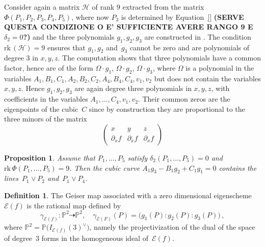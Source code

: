 \documentclass[a4paper, 11pt, reqno]{amsart}
\theoremstyle{plain}
\newtheorem{prop}[lemma]{Proposition}
\theoremstyle{definition}
\newtheorem{definition}[lemma]{Definition}
\newcommand{\p}{\mathbb{P}}
\newcommand{\rk}{\ensuremath{\mathrm{rk}}}
\newcommand{\Eig}[1]{\mathcal{E}\!\left( {#1} \right)}
\begin{document}
Consider again a matrix $\mathcal{H}$ of rank $9$ extracted from
the matrix $\Phi(P_1, P_2, P_3, P_4, P_5)$, where now $P_3$ is determined by Equation~\eqref{} \textbf{(SERVE QUESTA CONDIZIONE O E' SUFFICIENTE AVERE RANGO 9 E $\delta_2 = 0$?)}
and the three polynomials $g_1, g_2, g_3$ are constructed
in . The condition
$\rk \,(\mathcal{H}) = 9$ ensures that
$g_1, g_2$ and~$g_3$ cannot be zero and are polynomials of degree
$3$ in $x, y, z$.
The computation shows that three polynomials have a common factor,
hence are of the form $\Omega \cdot g_1$, $\Omega \cdot g_2$, $\Omega \cdot g_3$, where
$\Omega$ is a polynomial in the variables
$A_1, B_1, C_1, A_2, B_2, C_2, A_4, B_4, C_4, v_1, v_2$ but
does not contain the variables $x, y, z$.
Hence $g_1, g_2, g_3$ are again
degree three polynomials in $x, y, z$, with coefficients in the variables
$A_1, \dots, C_4, v_1, v_2$. Their common zeros are the eigenpoints of the
cubic~$C$ since by construction they are proportional to the three minors of the matrix
%
\[
  \left(
  \begin{array}{ccc}
    x & y & z \\
    \partial_x f & \partial_x f & \partial_x f
  \end{array}
  \right)
\]
%

\begin{prop}
\label{proposition:G_split}
Assume that $P_1, \dots, P_5 $ satisfy $\delta_2(P_1, \dotsc, P_5) = 0$ and $\rk \, \Phi(P_1, \dotsc, P_5) = 9$. Then the cubic curve $A_1 g_3 - B_1 g_2 + C_1 g_1=0$ contains the lines~$P_1 \vee P_2$ and~$P_1 \vee P_4$.
\end{prop}

\begin{definition}
%
The Geiser map associated with a zero dimensional eigenscheme $\Eig{f}$ is the rational map defined by
%
\[
  \gamma_{\Eig{f}} \colon \p ^2 \dasharrow \p^2, \quad
  \gamma_{\Eig{F}} (P) = \bigl( g_1(P):g_2(P):g_3(P) \bigr) \,,
\]
%
where $\p^2 = \p\bigl(I_{\Eig{f}}(3)^{\vee}\bigr)$, namely the projectivization of the dual of the space of degree~$3$ forms in the homogeneous ideal of~$\Eig{f}$.
\end{definition}
\end{document}
